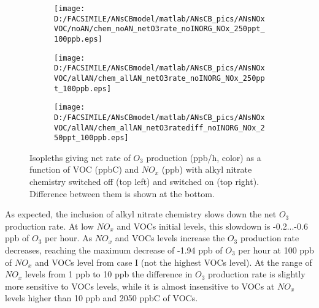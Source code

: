 \documentclass[11pt,a4paper]{article}
\begin{document}
\begin{figure}[h!] %
	\centering
	\begin{subfigure}[t]{0.45\textwidth}
        \centering
        \texttt{[image: D:/FACSIMILE/ANsCBmodel/matlab/ANsCB\_pics/ANsNOxVOC/noAN/chem\_noAN\_netO3rate\_noINORG\_NOx\_250ppt\_100ppb.eps]}
        \caption{}
    \end{subfigure}%
    \hfill
    \begin{subfigure}[t]{0.45\textwidth}
        \centering
        \texttt{[image: D:/FACSIMILE/ANsCBmodel/matlab/ANsCB\_pics/ANsNOxVOC/allAN/chem\_allAN\_netO3rate\_noINORG\_NOx\_250ppt\_100ppb.eps]}
        \caption{}
    \end{subfigure}
    \hfill
    \begin{subfigure}[t]{0.45\textwidth}
        \centering
        \texttt{[image: D:/FACSIMILE/ANsCBmodel/matlab/ANsCB\_pics/ANsNOxVOC/allAN/chem\_allAN\_netO3ratediff\_noINORG\_NOx\_250ppt\_100ppb.eps]}
        \caption{}
    \end{subfigure}%
    \hfill
\caption{Isopleths giving net rate of $O_3$ production (ppb/h, color) as a function of VOC (ppbC) and $NO_x$ (ppb) with alkyl nitrate chemistry switched off (top left) and switched on (top right). Difference between them is shown at the bottom.}\label{fig:netO3rate_noAN_withAN_diff}
\end{figure}

As expected, the inclusion of alkyl nitrate chemistry slows down the net $O_3$ production rate. At low $NO_x$ and VOCs initial levels, this slowdown is -0.2...-0.6 ppb of $O_3$ per hour. As $NO_x$ and VOCs levels increase the $O_3$ production rate decreases, reaching the maximum decrease of -1.94 ppb of $O_3$ per hour at 100 ppb of $NO_x$ and VOCs level from case I (not the highest VOCs level). At the range of $NO_x$ levels from 1 ppb to 10 ppb the difference in $O_3$ production rate is slightly more sensitive to VOCs levels, while it is almost insensitive to VOCs at $NO_x$ levels higher than 10 ppb and 2050 ppbC of VOCs. 
\end{document}
